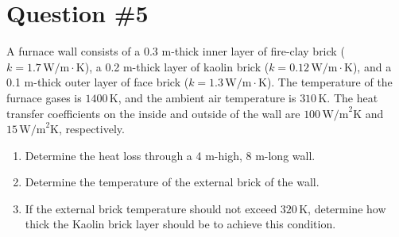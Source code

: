 \documentclass[12pt]{article}
\begin{document}
\section*{Question \#5}
A furnace wall consists of a 0.3 m-thick inner layer of fire-clay brick (\(k = 1.7 \, \text{W/m}\cdot\text{K}\)), a 0.2 m-thick layer of kaolin brick (\(k = 0.12 \, \text{W/m}\cdot\text{K}\)), and a 0.1 m-thick outer layer of face brick (\(k = 1.3 \, \text{W/m}\cdot\text{K}\)). The temperature of the furnace gases is \(1400 \, \text{K}\), and the ambient air temperature is \(310 \, \text{K}\). The heat transfer coefficients on the inside and outside of the wall are \(100 \, \text{W/m}^2\text{K}\) and \(15 \, \text{W/m}^2\text{K}\), respectively.

\begin{enumerate}
    \item Determine the heat loss through a 4 m-high, 8 m-long wall.
    \item Determine the temperature of the external brick of the wall.
    \item If the external brick temperature should not exceed \(320 \, \text{K}\), determine how thick the Kaolin brick layer should be to achieve this condition.
\end{enumerate}
\end{document}
